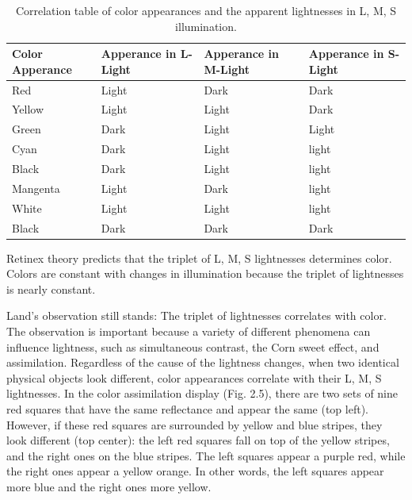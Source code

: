 \begin{table}[h!]
	\begin{center}
	\caption{Correlation table of color appearances and the apparent lightnesses in L, M, 		S illumination.}
    \label{tab:table1}
	\begin{tabular}{| m{3cm} | m{3cm}|m{3cm}|m{3cm}| }
	\hline
		\textbf{Color Apperance} & \textbf{Apperance in L-Light} & \textbf{Apperance in M-Light} & \textbf{Apperance in S-Light}\\
	\hline
		Red & Light & Dark & Dark \\
	\hline
		Yellow & Light & Light & Dark \\ 
	
	\hline
		Green & Dark & Light & Light \\ 
	
	\hline
		Cyan & Dark & Light & light \\ 
	
	\hline
		Black & Dark & Light & light \\ 
	
	\hline
		Mangenta & Light & Dark & light \\ 
	
	\hline
		White & Light & Light & light \\ 
	\hline
		Black & Dark & Dark & Dark \\ 
	
	\hline
	\end{tabular}
	\end{center}

\end{table}

Retinex theory predicts that the triplet of L, M, S lightnesses determines color. Colors are constant with changes in illumination because the triplet of lightnesses is nearly constant.

Land’s observation still stands: The triplet of lightnesses correlates with color. The observation is important because a variety of different phenomena can influence lightness, such as simultaneous contrast, the Corn sweet effect, and assimilation. Regardless of the cause of the lightness changes, when two identical physical objects look different, color appearances correlate with their L, M, S lightnesses. In the color assimilation display (Fig. 2.5), there are two sets of nine red squares that have the same reflectance and appear the same (top left). However, if these red squares are surrounded by yellow and blue stripes, they look different (top center): the left red squares fall on top of the yellow stripes, and the right ones on the blue stripes. The left squares appear a purple red, while the right ones appear a yellow orange. In other words, the left squares appear more blue and the right ones more yellow.

